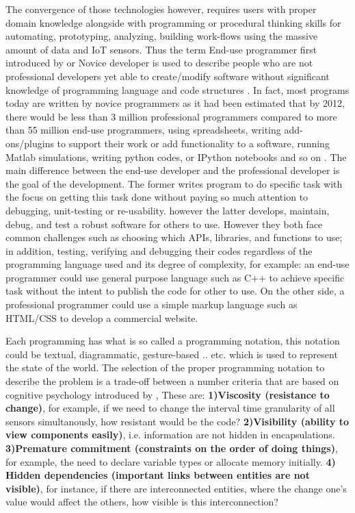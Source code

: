 The convergence of those technologies however, requires users with proper domain knowledge alongside with programming or procedural thinking skills for automating, prototyping, analyzing, building work-flows using the massive amount of data and IoT sensors. Thus the term End-use programmer first introduced by \citet{Nardi1993AComputing} or Novice developer is used to describe people who are not professional developers yet able to create/modify software without significant knowledge of programming language and code structures \cite{MARGARETM.BURNETTANDCHRISTOPHERSCAFFIDIEnd-UserEd.}. In fact, most programs today are written by novice programmers \citet{Rothermel2011TheEngineering} as it had been estimated that by 2012, there would be less than 3 million professional programmers compared to more than 55 million end-use programmers, using spreadsheets, writing add-ons/plugins to support their work or add functionality to a software, running Matlab simulations, writing python codes, or IPython notebooks and so on \citet{ScaffidiEstimatingProgrammers}. The main difference between the end-use developer and the professional developer is the goal of the development. The former writes program to do specific task with the focus on getting this task done without paying so much attention to debugging, unit-testing or re-usability. however the latter develops, maintain, debug, and test a robust software for others to use. However they both face common challenges such as choosing which APIs, libraries, and functions to use; in addition, testing, verifying and debugging their codes regardless of the programming language used and its degree of complexity, for example: an end-use programmer could use general purpose language such as C++ to achieve specific task without the intent to publish the code for other to use. On the other side, a professional programmer could use a simple markup language such as HTML/CSS to develop a commercial website.

Each programming has what is so called a programming notation, this notation could be textual, diagrammatic, gesture-based .. etc. which is used to represent the state of the world. The selection of the proper programming notation to describe the problem is a trade-off between a number criteria that are based on cognitive psychology introduced by \citet{Green2004InstructionsDescriptions}, These are: \textbf{1)Viscosity (resistance to change)}, for example, if we need to change the interval time granularity of all sensors simultanously, how resistant would be the code? \textbf{2)Visibility (ability to view components easily)}, i.e. information are not hidden in encapsulations. \textbf{3)Premature commitment (constraints on the order of doing things)}, for example, the need to declare variable types or allocate memory initially. \textbf{4) Hidden dependencies (important links between entities are not visible)}, for instance, if there are interconnected entities, where the change one's value would affect the others, how visible is this interconnection? 

